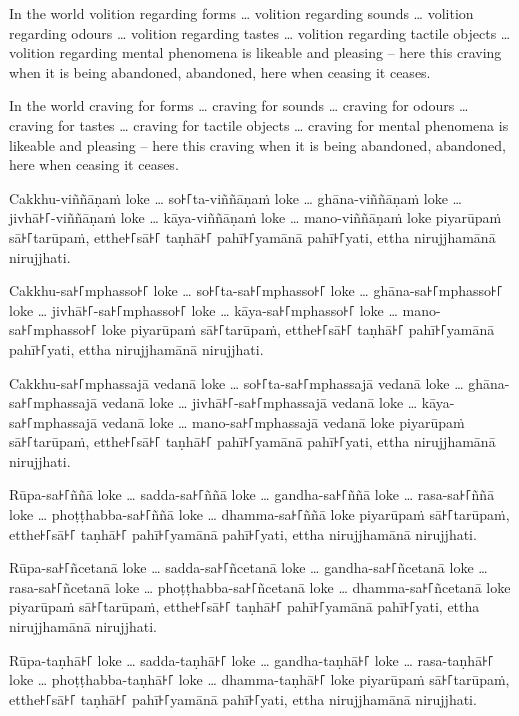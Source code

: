 In the world volition regarding forms \ldots{} volition regarding sounds
\ldots{} volition regarding odours \ldots{} volition regarding tastes \ldots{}
volition regarding tactile objects \ldots{} volition regarding mental phenomena
is likeable and pleasing -- here this craving when it is being abandoned,
abandoned, here when ceasing it ceases.

In the world craving for forms \ldots{} craving for sounds \ldots{} craving for
odours \ldots{} craving for tastes \ldots{} craving for tactile objects \ldots{}
craving for mental phenomena is likeable and pleasing -- here this craving when
it is being abandoned, abandoned, here when ceasing it ceases.

\paliPage

Cakkhu-viññāṇaṁ loke \ldots{} so꜔꜒ta-viññāṇaṁ loke \ldots{} ghāna-viññāṇaṁ loke
\ldots{} jivhā꜔꜒-viññāṇaṁ loke \ldots{} kāya-viññāṇaṁ loke \ldots{} mano-viññāṇaṁ
loke piyarūpaṁ sā꜔꜒tarūpaṁ, etthe꜔꜒sā꜔꜒ taṇhā꜔꜒ pahī꜔꜒yamānā pahī꜔꜒yati, ettha nirujjhamānā
nirujjhati.

Cakkhu-sa꜔꜒mphasso꜔꜒ loke \ldots{} so꜔꜒ta-sa꜔꜒mphasso꜔꜒ loke \ldots{} ghāna-sa꜔꜒mphasso꜔꜒ loke
\ldots{} jivhā꜔꜒-sa꜔꜒mphasso꜔꜒ loke \ldots{} kāya-sa꜔꜒mphasso꜔꜒ loke \ldots{} mano-sa꜔꜒mphasso꜔꜒
loke piyarūpaṁ sā꜔꜒tarūpaṁ, etthe꜔꜒sā꜔꜒ taṇhā꜔꜒ pahī꜔꜒yamānā pahī꜔꜒yati, ettha nirujjhamānā
nirujjhati.

Cakkhu-sa꜔꜒mphassajā vedanā loke \ldots{} so꜔꜒ta-sa꜔꜒mphassajā vedanā loke \ldots{}
ghāna-sa꜔꜒mphassajā vedanā loke \ldots{} jivhā꜔꜒-sa꜔꜒mphassajā vedanā loke \ldots{}
kāya-sa꜔꜒mphassajā vedanā loke \ldots{} mano-sa꜔꜒mphassajā vedanā loke piyarūpaṁ
sā꜔꜒tarūpaṁ, etthe꜔꜒sā꜔꜒ taṇhā꜔꜒ pahī꜔꜒yamānā pahī꜔꜒yati, ettha nirujjhamānā nirujjhati.

Rūpa-sa꜔꜒ññā loke \ldots{} sadda-sa꜔꜒ññā loke \ldots{} gandha-sa꜔꜒ññā loke \ldots{}
rasa-sa꜔꜒ññā loke \ldots{} phoṭṭhabba-sa꜔꜒ññā loke \ldots{} dhamma-sa꜔꜒ññā loke piyarūpaṁ
sā꜔꜒tarūpaṁ, etthe꜔꜒sā꜔꜒ taṇhā꜔꜒ pahī꜔꜒yamānā pahī꜔꜒yati, ettha nirujjhamānā nirujjhati.

Rūpa-sa꜔꜒ñcetanā loke \ldots{} sadda-sa꜔꜒ñcetanā loke \ldots{} gandha-sa꜔꜒ñcetanā loke
\ldots{} rasa-sa꜔꜒ñcetanā loke \ldots{} phoṭṭhabba-sa꜔꜒ñcetanā loke \ldots{}
dhamma-sa꜔꜒ñcetanā loke piyarūpaṁ sā꜔꜒tarūpaṁ, etthe꜔꜒sā꜔꜒ taṇhā꜔꜒ pahī꜔꜒yamānā pahī꜔꜒yati,
ettha nirujjhamānā nirujjhati.

Rūpa-taṇhā꜔꜒ loke \ldots{} sadda-taṇhā꜔꜒ loke \ldots{} gandha-taṇhā꜔꜒ loke \ldots{}
rasa-taṇhā꜔꜒ loke \ldots{} phoṭṭhabba-taṇhā꜔꜒ loke \ldots{} dhamma-taṇhā꜔꜒ loke piyarūpaṁ
sā꜔꜒tarūpaṁ, etthe꜔꜒sā꜔꜒ taṇhā꜔꜒ pahī꜔꜒yamānā pahī꜔꜒yati, ettha nirujjhamānā nirujjhati.

